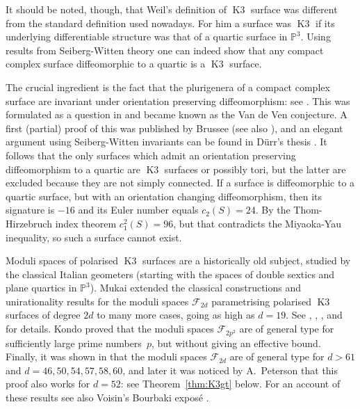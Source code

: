 \documentclass[a4paper,11pt]{article}
\newcommand{\PP}{\mathbb P}
\newcommand{\cF}{\mathcal F}
\newcommand{\Kthree}{\mathop{\mathrm {K3}}\nolimits}
\begin{document}
It should be noted, though, that Weil's definition of $\Kthree$
surface was different from the standard definition used nowadays. For
him a surface was $\Kthree$ if its underlying differentiable structure
was that of a quartic surface in $\PP^3$. Using results from
Seiberg-Witten theory one can indeed show that any compact complex
surface diffeomorphic to a quartic is a $\Kthree$ surface.

The crucial ingredient is the fact that the plurigenera of a compact
complex surface are invariant under orientation preserving
diffeomorphism: see \cite[Theorem IX.9.4 and Theorem
  IX.9.5]{BHPV}. This was formulated as a question in
\cite[p. 244]{OV} and became known as the Van de Ven conjecture.  A
first (partial) proof of this was published by Brussee \cite{Br} (see
also \cite{FM}), and an elegant argument using Seiberg-Witten
invariants can be found in D\"urr's thesis \cite{Du}. It follows that
the only surfaces which admit an orientation preserving diffeomorphism
to a quartic are $\Kthree$ surfaces or possibly tori, but the latter
are excluded because they are not simply connected. If a surface is
diffeomorphic to a quartic surface, but with an orientation changing
diffeomorphism, then its signature is $-16$ and its Euler number
equals $c_2(S)=24$. By the Thom-Hirzebruch index theorem
$c_1^2(S)=96$, but that contradicts the Miyaoka-Yau inequality, so
such a surface cannot exist.

Moduli spaces of polarised $\Kthree$ surfaces are a historically old
subject, studied by the classical Italian geometers (starting with the
spaces of double sextics and plane quartics in $\PP^3$).  Mukai
extended the classical constructions and unirationality results for
the moduli spaces $\cF_{2d}$ parametrising polarised $\Kthree$
surfaces of degree $2d$ to many more cases, going as high as
$d=19$. See \cite{Mu1}, \cite{Mu2}, \cite{Mu3}, \cite{Mu4} and
\cite{Mu5} for details.  Kondo \cite{Ko1} proved that the moduli
spaces $\cF_{2p^2}$ are of general type for sufficiently large prime
numbers~$p$, but without giving an effective bound.  Finally, it was
shown in \cite{GHSK3} that the moduli spaces $\cF_{2d}$ are of general
type for $d > 61$ and $d= 46,50,54,57,58,60$, and later it was noticed
by A.~Peterson \cite{PeSa} that this proof also works for $d=52$: see
Theorem~\ref{thm:K3gt} below. For an account of these results see also
Voisin's Bourbaki expos\'e \cite{Vo1}.
\end{document}
